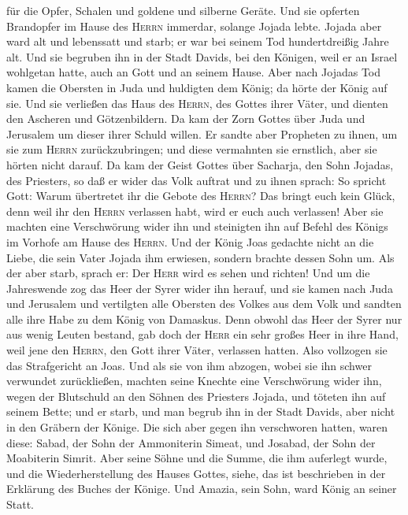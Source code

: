 für die Opfer, Schalen und goldene und silberne Geräte. Und sie opferten
Brandopfer im Hause des \textsc{Herrn} immerdar, solange Jojada lebte.
 Jojada aber ward alt und lebenssatt und starb; er war
bei seinem Tod hundertdreißig Jahre alt.  Und sie
begruben ihn in der Stadt Davids, bei den Königen, weil er an Israel
wohlgetan hatte, auch an Gott und an seinem Hause.  Aber
nach Jojadas Tod kamen die Obersten in Juda und huldigten dem König; da
hörte der König auf sie.  Und sie verließen das Haus des
\textsc{Herrn}, des Gottes ihrer Väter, und dienten den Ascheren und
Götzenbildern. Da kam der Zorn Gottes über Juda und Jerusalem um dieser
ihrer Schuld willen.  Er sandte aber Propheten zu ihnen,
um sie zum \textsc{Herrn} zurückzubringen; und diese vermahnten sie
ernstlich, aber sie hörten nicht darauf.  Da kam der
Geist Gottes über Sacharja, den Sohn Jojadas, des Priesters, so daß er
wider das Volk auftrat und zu ihnen sprach: So spricht Gott: Warum
übertretet ihr die Gebote des \textsc{Herrn}? Das bringt euch kein
Glück, denn weil ihr den \textsc{Herrn} verlassen habt, wird er euch
auch verlassen!  Aber sie machten eine Verschwörung wider
ihn und steinigten ihn auf Befehl des Königs im Vorhofe am Hause des
\textsc{Herrn}.  Und der König Joas gedachte nicht an die
Liebe, die sein Vater Jojada ihm erwiesen, sondern brachte dessen Sohn
um. Als der aber starb, sprach er: Der \textsc{Herr} wird es sehen und
richten!  Und um die Jahreswende zog das Heer der Syrer
wider ihn herauf, und sie kamen nach Juda und Jerusalem und vertilgten
alle Obersten des Volkes aus dem Volk und sandten alle ihre Habe zu dem
König von Damaskus.  Denn obwohl das Heer der Syrer nur
aus wenig Leuten bestand, gab doch der \textsc{Herr} ein sehr großes
Heer in ihre Hand, weil jene den \textsc{Herrn}, den Gott ihrer Väter,
verlassen hatten. Also vollzogen sie das Strafgericht an Joas.
 Und als sie von ihm abzogen, wobei sie ihn schwer
verwundet zurückließen, machten seine Knechte eine Verschwörung wider
ihn, wegen der Blutschuld an den Söhnen des Priesters Jojada, und
töteten ihn auf seinem Bette; und er starb, und man begrub ihn in der
Stadt Davids, aber nicht in den Gräbern der Könige.  Die
sich aber gegen ihn verschworen hatten, waren diese: Sabad, der Sohn der
Ammoniterin Simeat, und Josabad, der Sohn der Moabiterin Simrit.
 Aber seine Söhne und die Summe, die ihm auferlegt wurde,
und die Wiederherstellung des Hauses Gottes, siehe, das ist beschrieben
in der Erklärung des Buches der Könige. Und Amazia, sein Sohn, ward
König an seiner Statt.

